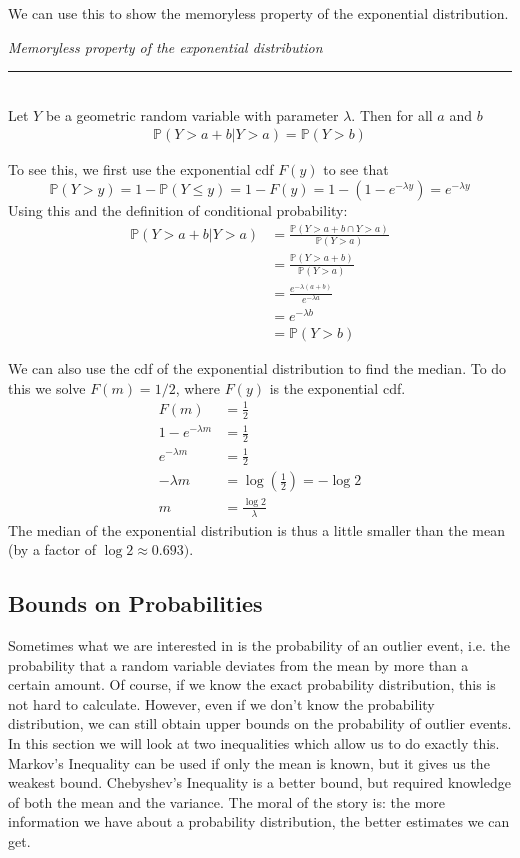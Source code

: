 \documentclass[12pt]{article}
\theoremstyle{definition}
\theoremstyle{remark}
\def\P{{\mathbb P}}
\begin{document}
We can use this to show the memoryless property of the exponential distribution.

\begin{framed}
\emph{Memoryless property of the exponential distribution}\\
  \rule{\dimexpr{}\fboxrule}{.1pt} \\
Let $Y$ be a geometric random variable with parameter $\lambda$. Then for all $a$ and $b$
\begin{align*}
\P(Y > a + b | Y > a) = \P(Y > b)
\end{align*}
\end{framed}
To see this, we first use the exponential cdf $F(y)$ to see that
\[
\P(Y > y) = 1 - \P(Y \leq y) = 1 - F(y) = 1 - (1 - e^{-\lambda y}) = e^{-\lambda y}
\]
Using this and the definition of conditional probability:
\begin{align*}
\P(Y > a + b | Y > a) &= \frac{ \P(Y > a + b \cap Y > a) }{ \P(Y > a )} \\
&= \frac{ \P(Y > a + b ) }{ \P(Y > a )} \\
&= \frac{e^{-\lambda(a+b)}}{e^{-\lambda a}} \\
&= e^{-\lambda b} \\
&= \P(Y > b)
\end{align*}

We can also use the cdf of the exponential distribution to find the median. To do this we solve $F(m) = 1/2$, where $F(y)$ is the exponential cdf.
\begin{align*}
F(m) &= \frac{1}{2} \\
1 - e^{-\lambda m} &= \frac{1}{2} \\
e^{-\lambda m} &= \frac{1}{2} \\
- \lambda m &= \log\left( \frac{1}{2} \right) = -\log 2 \\
m &= \frac{\log 2}{\lambda}
\end{align*} 
The median of the exponential distribution is thus a little smaller than the mean (by a factor of $\log 2 \approx 0.693)$.

\subsection{Bounds on Probabilities}
Sometimes what we are interested in is the probability of an outlier event, i.e. the probability that a random variable deviates from the mean by more than a certain amount. Of course, if we know the exact probability distribution, this is not hard to calculate. However, even if we don't know the probability distribution, we can still obtain upper bounds on the probability of outlier events. In this section we will look at two inequalities which allow us to do exactly this. Markov's Inequality can be used if only the mean is known, but it gives us the weakest bound. Chebyshev's Inequality is a better bound, but required knowledge of both the mean and the variance. The moral of the story is: the more information we have about a probability distribution, the better estimates we can get.
\end{document}
